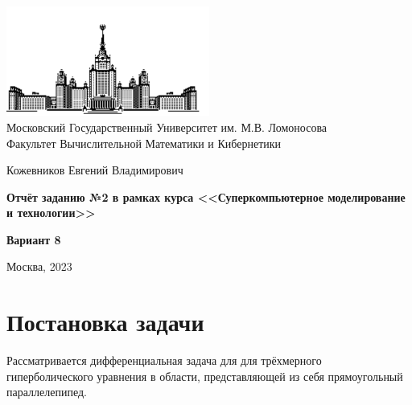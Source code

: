 \documentclass[a4paper,hidelinks,12pt]{article}
\begin{document}
\begin {titlepage}
\thispagestyle{empty}

\begin{center}
\vspace{-1cm}

\includegraphics[width=0.5\textwidth]{msu}\\
Московский Государственный Университет им. М.В. Ломоносова\\
Факультет Вычислительной Математики и Кибернетики\\

\vspace{3cm}

{\Large Кожевников Евгений Владимирович}

\vspace{1cm}

{\LARGE\bfseries Отчёт заданию №2 в рамках курса <<Суперкомпьютерное моделирование\\ и технологии>>\par}

\vspace{1cm}

{\Large\bfseries Вариант 8}

\end{center}

\vfill

\begin{center}
Москва, 2023
\end{center}

\end{titlepage}

\setcounter{page}{2}
\onehalfspacing

\newpage
\tableofcontents

\setlength{\parskip}{0.8em}
\newpage

\section{Постановка задачи}

Рассматривается дифференциальная задача для для трёхмерного гиперболического уравнения в области, представляющей из себя прямоугольный параллелепипед.
\end{document}
